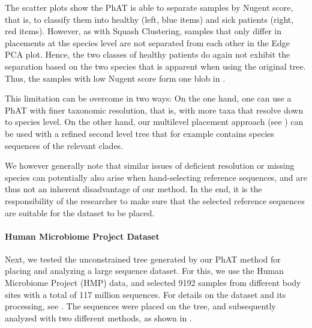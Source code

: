The scatter plots show the \ac{PhAT} is able to separate samples by Nugent score, that is, to classify them
into healthy (left, blue items) and sick patients (right, red items).
However, as with Squash Clustering, samples that only differ in placements at the species level
are not separated from each other in the Edge PCA plot.
Hence, the two classes of healthy patients do again not exhibit
the separation based on the two  species that is apparent when using the original tree.
Thus, the samples with low Nugent score form one blob in .

This limitation can be overcome in two ways:
On the one hand, one can use a \ac{PhAT} with finer taxonomic resolution,
that is, with more taxa that resolve down to species level.
On the other hand, our multilevel placement approach (see )
can be used with a refined second level tree
that for example contains species sequences of the relevant  clades.

We however generally note that similar issues of deficient resolution or missing species
can potentially also arise when hand-selecting reference sequences,
and are thus not an inherent disadvantage of our method.
In the end, it is the responsibility of the researcher to make sure that the selected reference sequences
are suitable for the dataset to be placed.

\paragraph{Human Microbiome Project Dataset}
\label{ch:AutomaticTrees:sec:Evaluation:sub:EmpiricalDatasets:par:HMP}

Next, we tested the unconstrained  tree generated by our \ac{PhAT} method
for placing and analyzing a large sequence dataset.
For this, we use the Human Microbiome Project (HMP) \citep{Huttenhower2012,Methe2012} data,
and selected \num{9192} samples from different body sites with a total of 117 million sequences.
For details on the dataset and its processing, see .
The sequences were placed on the tree, and subsequently analyzed with two different methods,
as shown in .

